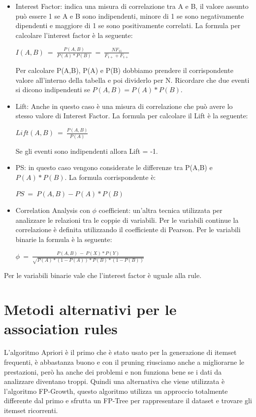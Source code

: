 \documentclass[14pt]{extreport}
\begin{document}
\begin{itemize}
    \item Interest Factor: indica una misura di correlazione tra A e B, il valore assunto può essere 1 se A e B sono indipendenti, minore di 1 se sono negativamente dipendenti e maggiore di 1 se sono positivamente correlati.
    La formula per calcolare l'interest factor è la seguente:
    \newline
    \centerline{$I(A,B)\ =\ \frac{P(A,B)}{P(A)*P(B)}\ =\ \frac{NF_{11}}{F_{1+} + F_{1+}} $}
    Per calcolare P(A,B), P(A) e P(B) dobbiamo prendere il corrispondente valore all'interno della tabella e poi dividerlo per N.
    Ricordare che due eventi si dicono indipendenti se $P(A,B) = P(A)*P(B)$.
    \item Lift: Anche in questo caso è una misura di correlazione che può avere lo stesso valore di Interest Factor.
    La formula per calcolare il Lift è la seguente:
    \newline
    \centerline{$Lift(A,B)\ =\ \frac{P(A,B)}{P(A)} $}
    Se gli eventi sono indipendenti allora Lift = -1.
    \item PS: in questo caso vengono considerate le differenze tra P(A,B) e $P(A)*P(B)$.
    La formula corrispondente è:
    \newline
    \centerline{$PS\ =\ P(A,B) - P(A)*P(B)$}
    \item Correlation Analysis con $\phi$ coefficient: un'altra tecnica utilizzata per analizzare le relazioni tra le coppie di variabili.
    Per le variabili continue la correlazione è definita utilizzando il coefficiente di Pearson.
    Per le variabili binarie la formula è la seguente:
    \newline
    \centerline{$\phi\ =\ \frac{P(A,B)\ -\ P(X)*P(Y)}{\sqrt{P(A)*(1-P(A))*P(B)*(1-P(B))}}$}
\end{itemize}

Per le variabili binarie vale che l'interest factor è uguale alla rule.

\newpage
\section{Metodi alternativi per le association rules}

L'algoritmo Apriori è il primo che è stato usato per la generazione di itemset frequenti, è abbastanza buono e con il pruning riusciamo anche a migliorarne le prestazioni, però ha anche dei problemi e non funziona bene se i dati da analizzare diventano troppi.
Quindi una alternativa che viene utilizzata è l'algoritmo FP-Growth, questo algoritmo utilizza un approccio totalmente differente dal primo e sfrutta un FP-Tree per rappresentare il dataset e trovare gli itemset ricorrenti.
\end{document}
